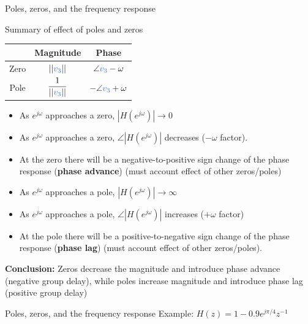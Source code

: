 \documentclass[10pt]{beamer}
\begin{document}
%
\begin{frame}{Poles, zeros, and the frequency response}

Summary of effect of poles and zeros

\begin{center}
	\begin{tabular}{c|c|c}
	& Magnitude & Phase \\
	\hline
	Zero & $||{\color{blue2} v_3}||$ & $\angle {\color{blue2} v_3} - \omega$ \\
	Pole & $\displaystyle\frac{1}{||{\color{blue2} v_3}||}$ & $-\angle {\color{blue2} v_3} + \omega$ \\
	\hline
\end{tabular}
\end{center}

\begin{itemize}
	\pause\item As $e^{j\omega}$ approaches a zero, $|H(e^{j\omega})| \to 0$
	\pause\item As $e^{j\omega}$ approaches a zero, $\angle |H(e^{j\omega})|$ decreases ($- \omega$ factor).
	\pause\item At the zero there will be a negative-to-positive sign change of the phase response (\textbf{phase advance}) (must account effect of other zeros/poles)
	\pause\item As $e^{j\omega}$ approaches a pole, $|H(e^{j\omega})| \to \infty$
	\pause\item As $e^{j\omega}$ approaches a pole, $\angle |H(e^{j\omega})|$ increases ($+ \omega$ factor)
	\pause\item At the pole there will be a positive-to-negative sign change of the phase response (\textbf{phase lag}) (must account effect of other zeros/poles).	
\end{itemize}

\pause
\textbf{Conclusion:} Zeros decrease the magnitude and introduce phase advance (negative group delay), while poles increase magnitude and introduce phase lag (positive group delay)

\end{frame}

%
\begin{frame}{Poles, zeros, and the frequency response}
	Example: $H(z) = 1 - 0.9e^{j\pi/4}z^{-1}$
	\begin{center}
		\resizebox{\linewidth}{!}{}
	\end{center}	
\end{frame}
\end{document}
